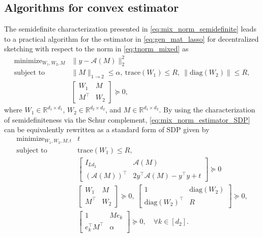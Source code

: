 \documentclass[11pt]{article}
\begin{document}
\subsection{Algorithms for convex estimator} 

The semidefinite characterization presented in \eqref{eq:mix_norm_semidefinite} leads to a practical algorithm for the estimator in \eqref{eq:gen_mat_lasso} for decentralized sketching with respect to the norm in \eqref{eq:tnorm_mixed} as 
\begin{equation}
\label{eq:mix_norm_estimator_SDP}
\begin{array}{ll}
\displaystyle \mathop{\text{minimize}}_{W_1,W_2,M} & \|y - \mathcal{A}(M)\|_2^2 \\
\text{subject to} & \|M\|_{1 \rightarrow 2} \leq \alpha, \ \mathrm{trace}(W_1) \leq R, \ \|\mathrm{diag}(W_2)\| \leq R,
\\[5pt]
& \begin{bmatrix} W_1 & M\\ M^\top & W_2 \end{bmatrix} \succeq 0,
\end{array}
\end{equation}
where $W_1 \in \mathbb{R}^{d_1 \times d_1}$, $W_2 \in \mathbb{R}^{d_2 \times d_2}$, and $M \in \mathbb{R}^{d_1 \times d_2}$. 
By using the characterization of semidefiniteness via the Schur complement, \eqref{eq:mix_norm_estimator_SDP} can be equivalently rewritten as a standard form of SDP given by
\begin{equation}
\label{eq:mix_norm_estimator_SDP_std}
\begin{array}{ll}
\displaystyle \mathop{\text{minimize}}_{W_1,W_2,M,t} & t \\
\text{subject to} & \mathrm{trace}(W_1) \leq R, \\[5pt]
& \begin{bmatrix} I_{Ld_2} & \mathcal{A}(M) \\ \left(\mathcal{A}(M)\right)^\top & 2 y^\top \mathcal{A}(M) - y^\top y + t \end{bmatrix} \succeq 0 \\[10pt]
& \begin{bmatrix} W_1 & M\\ M^\top & W_2 \end{bmatrix} \succeq 0, \ \begin{bmatrix} 1 & \mathrm{diag}(W_2) \\ \mathrm{diag}(W_2)^\top & R \end{bmatrix} \succeq 0, \\[10pt]
& \begin{bmatrix} 1 & M e_k \\ e_k^\top M^\top & \alpha \end{bmatrix} \succeq 0, \quad \forall k \in [d_2].
\end{array}
\end{equation}
\end{document}
